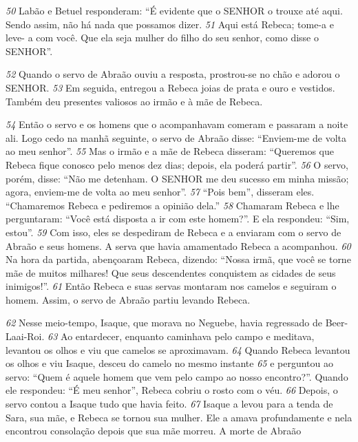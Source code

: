 \bigskip
\textit{\tiny 50}
Labão e Betuel responderam: “É evidente que o SENHOR o trouxe até aqui.
Sendo assim, não há nada que possamos dizer. 
\textit{\tiny 51}
Aqui está Rebeca; tome-a e leve-
a com você. Que ela seja mulher do filho do seu senhor, como disse o SENHOR”.

\bigskip
\textit{\tiny 52}
Quando o servo de Abraão ouviu a resposta, prostrou-se no chão e adorou o
SENHOR. 
\textit{\tiny 53}
Em seguida, entregou a Rebeca joias de prata e ouro e vestidos.
Também deu presentes valiosos ao irmão e à mãe de Rebeca. 

\bigskip
\textit{\tiny 54}
Então o servo e os
homens que o acompanhavam comeram e passaram a noite ali.
   Logo cedo na manhã seguinte, o servo de Abraão disse: “Enviem-me de volta ao
meu senhor”.
\textit{\tiny 55}
Mas o irmão e a mãe de Rebeca disseram: “Queremos que Rebeca fique
conosco pelo menos dez dias; depois, ela poderá partir”.
\textit{\tiny 56}
O servo, porém, disse: “Não me detenham. O SENHOR me deu sucesso em
minha missão; agora, enviem-me de volta ao meu senhor”.
\textit{\tiny 57}
“Pois bem”, disseram eles. “Chamaremos Rebeca e pediremos a opinião
dela.” 
\textit{\tiny 58}
Chamaram Rebeca e lhe perguntaram: “Você está disposta a ir com este
homem?”.
   E ela respondeu: “Sim, estou”.
\textit{\tiny 59}
Com isso, eles se despediram de Rebeca e a enviaram com o servo de Abraão
e seus homens. A serva que havia amamentado Rebeca a acompanhou. 
\textit{\tiny 60}
Na hora
da partida, abençoaram Rebeca, dizendo:
  “Nossa irmã, que você se torne
    mãe de muitos milhares!
  Que seus descendentes
    conquistem as cidades de seus inimigos!”.
\textit{\tiny 61}
Então Rebeca e suas servas montaram nos camelos e seguiram o homem. Assim,
o servo de Abraão partiu levando Rebeca.

\bigskip
\textit{\tiny 62}
Nesse meio-tempo, Isaque, que morava no Neguebe, havia regressado de
Beer-Laai-Roi. 
\textit{\tiny 63}
Ao entardecer, enquanto caminhava pelo campo e meditava,
levantou os olhos e viu que camelos se aproximavam. 
\textit{\tiny 64}
Quando Rebeca levantou
os olhos e viu Isaque, desceu do camelo no mesmo instante 
\textit{\tiny 65}
e perguntou ao
servo: “Quem é aquele homem que vem pelo campo ao nosso encontro?”.
   Quando ele respondeu: “É meu senhor”, Rebeca cobriu o rosto com o véu.
\textit{\tiny 66}
Depois, o servo contou a Isaque tudo que havia feito.
\textit{\tiny 67}
Isaque a levou para a tenda de Sara, sua mãe, e Rebeca se tornou sua mulher.
Ele a amava profundamente e nela encontrou consolação depois que sua mãe
morreu.
A morte de Abraão

